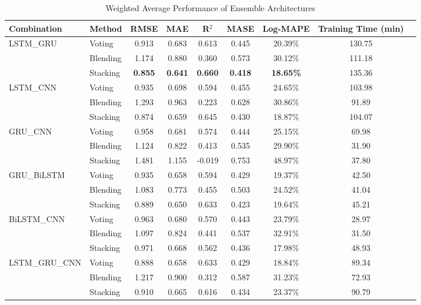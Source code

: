 \begin{table}[h!]
\centering
\caption{Weighted Average Performance of Ensemble Architectures}
\label{tab:ensemble_performance}
\tiny %
\begin{tabular}{@{}llccccccc@{}} %
\toprule
\textbf{Combination} & \textbf{Method} & \textbf{RMSE} & \textbf{MAE} & \textbf{R$^2$} & \textbf{MASE} & \textbf{Log-MAPE} & \textbf{Training Time (min)} \\
\midrule
\multirow{3}{*}{LSTM\_GRU} & Voting & 0.913 & 0.683 & 0.613 & 0.445 & 20.39\% & 130.75 \\
& Blending & 1.174 & 0.880 & 0.360 & 0.573 & 30.12\% & 111.18 \\
& Stacking & \textbf{0.855} & \textbf{0.641} & \textbf{0.660} & \textbf{0.418} & \textbf{18.65\%} & 135.36 \\
\midrule
\multirow{3}{*}{LSTM\_CNN} & Voting & 0.935 & 0.698 & 0.594 & 0.455 & 24.65\% & 103.98 \\
& Blending & 1.293 & 0.963 & 0.223 & 0.628 & 30.86\% & 91.89 \\
& Stacking & 0.874 & 0.659 & 0.645 & 0.430 & 18.87\% & 104.07 \\
\midrule
\multirow{3}{*}{GRU\_CNN} & Voting & 0.958 & 0.681 & 0.574 & 0.444 & 25.15\% & 69.98 \\
& Blending & 1.124 & 0.822 & 0.413 & 0.535 & 29.90\% & 31.90 \\
& Stacking & 1.481 & 1.155 & -0.019 & 0.753 & 48.97\% & 37.80 \\
\midrule
\multirow{3}{*}{GRU\_BiLSTM} & Voting & 0.935 & 0.658 & 0.594 & 0.429 & 19.37\% & 42.50 \\
& Blending & 1.083 & 0.773 & 0.455 & 0.503 & 24.52\% & 41.04 \\
& Stacking & 0.889 & 0.650 & 0.633 & 0.423 & 19.64\% & 45.21 \\
\midrule
\multirow{3}{*}{BiLSTM\_CNN} & Voting & 0.963 & 0.680 & 0.570 & 0.443 & 23.79\% & 28.97 \\
& Blending & 1.097 & 0.824 & 0.441 & 0.537 & 32.91\% & 31.50 \\
& Stacking & 0.971 & 0.668 & 0.562 & 0.436 & 17.98\% & 48.93 \\
\midrule
\multirow{3}{*}{LSTM\_GRU\_CNN} & Voting & 0.888 & 0.658 & 0.633 & 0.429 & 18.84\% & 89.34 \\
& Blending & 1.217 & 0.900 & 0.312 & 0.587 & 31.23\% & 72.93 \\
& Stacking & 0.910 & 0.665 & 0.616 & 0.434 & 23.37\% & 90.79 \\
\bottomrule
\end{tabular}
\end{table}

